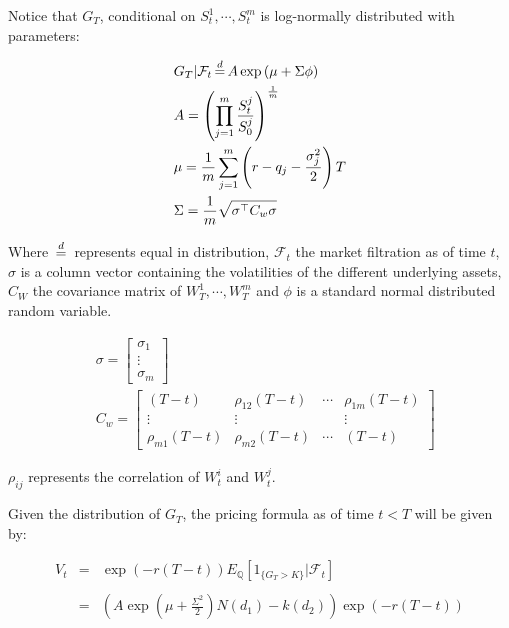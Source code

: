 Notice that $G_T$, conditional on $S_t^1,\cdots,S_t^m$ is log-normally distributed with parameters:



\begin{equation} 
\label{eq:geom_digital_distrib_params1}
\begin{aligned} 
& G_T|\mathcal{F}_t \eqdistr A \exp\left(\mu+\Sigma\phi\right)\\
& A = \left(\prod_{j=1}^m\frac{S_{t}^{j}}{S_{0}^{j}}\right)^{\frac{1}{m}} \\
&\mu = \frac{1}{m}\sum_{j=1}^{m}\left(r-q_{j}-\frac{\sigma_{j}^{2}}{2}\right)T \\   
& \Sigma=\frac{1}{m}\sqrt{\sigma^{\top} C_{w} \sigma}
\end{aligned}
\end{equation}

Where $\eqdistr$ represents equal in distribution, $\mathcal{F}_t$ the market filtration as of time $t$, $\sigma$ is a column vector containing the volatilities of the different underlying assets, $C_W$ the covariance matrix of $W_T^1,\cdots,W_T^m$ and $\phi$ is a standard normal distributed random variable.

\begin{equation} \label{eq:geom_digital_distrib_params2}
\begin{aligned}
&\sigma=\left[\begin{array}{c}
\sigma_{1} \\
\vdots \\
\sigma_{m}
\end{array}\right] \\
&C_{w}=\left[\begin{array}{cccc}
\left(T-t\right) & \rho_{12} \left(T-t\right) & \cdots & \rho_{1 m} \left(T-t\right) \\
\vdots & \vdots & & \vdots \\
\rho_{m 1} \left(T-t\right) & \rho_{m 2} \left(T-t\right) & \cdots &  \left(T-t\right)
\end{array}\right]
\end{aligned}
\end{equation} 

$\rho_{ij}$ represents the correlation of $W_t^i$ and $W_t^j$.

Given the distribution of $G_T$, the pricing formula as of time $t<T$ will be given by:

$$
\begin{array}{lll}
V_{t}&=&\exp (-r(T-t)) E_{\mathbb{Q}}\left[1_{\{G_{T}>K\}} | \mathcal{F}_t\right] \\
&& \\
&=&\left(A\exp\left(\mu+\frac{\Sigma^2}{2}\right)N\left(d_1\right)-k\left(d_2\right)\right)\exp\left(-r(T-t)\right)
\end{array}
$$

